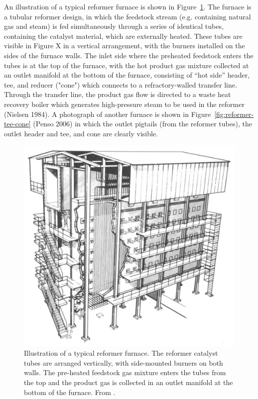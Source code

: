 An illustration of a typical reformer furnace is shown in Figure~\ref{fig:reformer-furnace}. The furnace is a tubular reformer design, in which the feedstock stream (e.g. containing natural gas and steam) is fed simultaneously through a series of identical tubes, containing the catalyst material, which are externally heated. These tubes are visible in Figure X in a vertical arrangement, with the burners installed on the sides of the furnace walls. The inlet side where the preheated feedstock enters the tubes is at the top of the furnace, with the hot product gas mixture collected at an outlet manifold at the bottom of the furnace, consisting of ``hot side'' header, tee, and reducer ("cone") which connects to a refractory-walled transfer line. Through the transfer line, the product gas flow is directed to a waste heat recovery boiler which generates high-pressure steam to be used in the reformer (Nielsen 1984). A photograph of another furnace is shown in Figure~\ref{fig:reformer-tee-cone} (Penso 2006) in which the outlet pigtails (from the reformer tubes), the outlet header and tee, and cone are clearly visible.

\begin{figure}[h]
\centering
\includegraphics{figures/reformer-furnace}
\caption{Illustration of a typical reformer furnace. The reformer catalyst tubes are arranged vertically, with side-mounted burners on both walls. The pre-heated feedstock gas mixture enters the tubes from the top and the product gas is collected in an outlet manifold at the bottom of the furnace.  From \citet[Fig.~9]{anderson_catalytic_1984}.}
\label{fig:reformer-furnace}
\end{figure}

